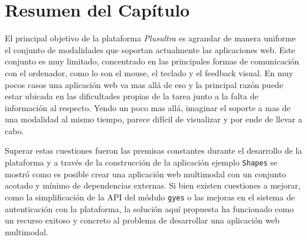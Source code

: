\section{Resumen del Capítulo}
El principal objetivo de la plataforma \emph{Plusultra} es agrandar de manera uniforme el conjunto de modalidades que soportan actualmente las aplicaciones web. Este conjunto  es muy limitado, concentrado en las principales formas de comunicación con el ordenador, como lo son el mouse, el teclado y el feedback visual. En muy pocos casos una aplicación web va mas allá de eso y la principal razón puede estar ubicada en las dificultades propias de la tarea junto a la falta de información al respecto. Yendo un poco mas allá, imaginar el soporte a mas de una modalidad al mismo tiempo, parece difícil de visualizar y por ende de llevar a cabo.

Superar estas cuestiones fueron las premisas constantes durante el desarrollo de la plataforma y a través de la construcción de la aplicación ejemplo \texttt{Shapes} se mostró como es posible crear una aplicación web multimodal con un conjunto acotado y mínimo de  dependencias externas. Si bien existen cuestiones a mejorar, como la simplificación de la API del módulo \texttt{gyes} o las mejoras en el sistema de autenticación con la plataforma, la solución aquí propuesta ha funcionado como un recurso exitoso y concreto al problema de desarrollar una aplicación web multimodal.
